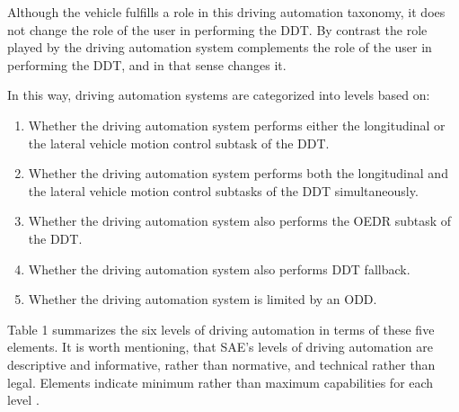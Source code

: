 Although the vehicle fulfills a role in this driving automation taxonomy, it does not change the role of the user in performing the DDT. 
By contrast the role played by the driving automation system complements the role of the user in performing the DDT, and in that sense changes it.

In this way, driving automation systems are categorized into levels based on:

\begin{enumerate}

  \item Whether the driving automation system performs either the longitudinal or the lateral vehicle motion control subtask of the DDT.
  \item Whether the driving automation system performs both the longitudinal and the lateral vehicle motion control subtasks of the DDT simultaneously.
  \item Whether the driving automation system also performs the OEDR subtask of the DDT.
  \item Whether the driving automation system also performs DDT fallback.
  \item Whether the driving automation system is limited by an ODD. 

\end{enumerate}

Table 1 summarizes the six levels of driving automation in terms of these five elements.
It is worth mentioning, that SAE’s levels of driving automation are descriptive and informative, rather than normative, and technical rather than legal.
Elements indicate minimum rather than maximum capabilities for each level \cite{saej3016}.

